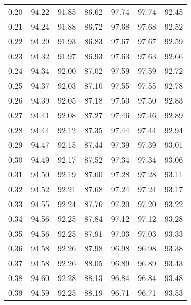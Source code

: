 \begin{tabular}{|c|c|c|c|c|c|c|}
      0.20 &     94.22 &     91.85 &      86.62 &   97.74 &      97.74 &         92.45 \\
      0.21 &     94.24 &     91.88 &      86.72 &   97.68 &      97.68 &         92.52 \\
      0.22 &     94.29 &     91.93 &      86.83 &   97.67 &      97.67 &         92.59 \\
      0.23 &     94.32 &     91.97 &      86.93 &   97.63 &      97.63 &         92.66 \\
      0.24 &     94.34 &     92.00 &      87.02 &   97.59 &      97.59 &         92.72 \\
      0.25 &     94.37 &     92.03 &      87.10 &   97.55 &      97.55 &         92.78 \\
      0.26 &     94.39 &     92.05 &      87.18 &   97.50 &      97.50 &         92.83 \\
      0.27 &     94.41 &     92.08 &      87.27 &   97.46 &      97.46 &         92.89 \\
      0.28 &     94.44 &     92.12 &      87.35 &   97.44 &      97.44 &         92.94 \\
      0.29 &     94.47 &     92.15 &      87.44 &   97.39 &      97.39 &         93.01 \\
      0.30 &     94.49 &     92.17 &      87.52 &   97.34 &      97.34 &         93.06 \\
      0.31 &     94.50 &     92.19 &      87.60 &   97.28 &      97.28 &         93.11 \\
      0.32 &     94.52 &     92.21 &      87.68 &   97.24 &      97.24 &         93.17 \\
      0.33 &     94.55 &     92.24 &      87.76 &   97.20 &      97.20 &         93.22 \\
      0.34 &     94.56 &     92.25 &      87.84 &   97.12 &      97.12 &         93.28 \\
      0.35 &     94.56 &     92.25 &      87.91 &   97.03 &      97.03 &         93.33 \\
      0.36 &     94.58 &     92.26 &      87.98 &   96.98 &      96.98 &         93.38 \\
      0.37 &     94.58 &     92.26 &      88.05 &   96.89 &      96.89 &         93.43 \\
      0.38 &     94.60 &     92.28 &      88.13 &   96.84 &      96.84 &         93.48 \\
      0.39 &     94.59 &     92.25 &      88.19 &   96.71 &      96.71 &         93.53 \\

\end{tabular}
